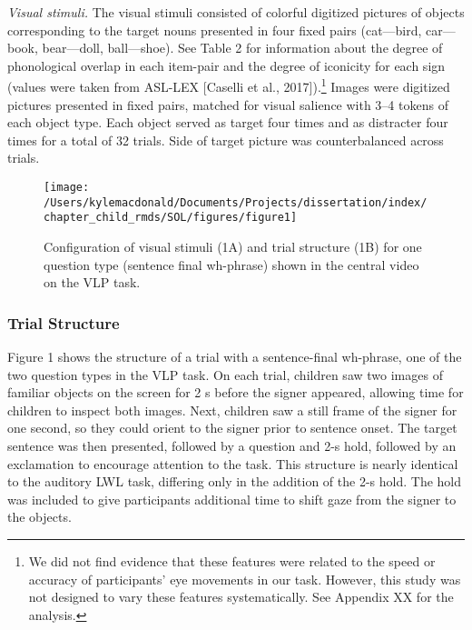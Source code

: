 \documentclass[oneside]{report}
\begin{document}
\emph{Visual stimuli.} The visual stimuli consisted of colorful
digitized pictures of objects corresponding to the target nouns
presented in four fixed pairs (cat---bird, car---book, bear---doll,
ball---shoe). See Table 2 for information about the degree of
phonological overlap in each item-pair and the degree of iconicity for
each sign (values were taken from ASL-LEX {[}Caselli et al.,
2017{]}).\footnote{We did not find evidence that these features were
  related to the speed or accuracy of participants' eye movements in our
  task. However, this study was not designed to vary these features
  systematically. See Appendix XX for the analysis.} Images were
digitized pictures presented in fixed pairs, matched for visual salience
with 3--4 tokens of each object type. Each object served as target four
times and as distracter four times for a total of 32 trials. Side of
target picture was counterbalanced across trials.
\begin{figure}[t]

{\centering \texttt{[image: /Users/kylemacdonald/Documents/Projects/dissertation/index/chapter\_child\_rmds/SOL/figures/figure1]} 

}

\caption[Stimuli in the Visual Language Processing Task used in Experiment 1.1]{Configuration of visual stimuli (1A) and trial structure (1B) for one question type (sentence final wh-phrase) shown in the central video on the VLP task.}\label{fig:sol-trial-fig}
\end{figure}
\subsubsection{Trial Structure}\label{trial-structure}

Figure 1 shows the structure of a trial with a sentence-final wh-phrase,
one of the two question types in the VLP task. On each trial, children
saw two images of familiar objects on the screen for 2 s before the
signer appeared, allowing time for children to inspect both images.
Next, children saw a still frame of the signer for one second, so they
could orient to the signer prior to sentence onset. The target sentence
was then presented, followed by a question and 2-s hold, followed by an
exclamation to encourage attention to the task. This structure is nearly
identical to the auditory LWL task, differing only in the addition of
the 2-s hold. The hold was included to give participants additional time
to shift gaze from the signer to the objects.
\end{document}
